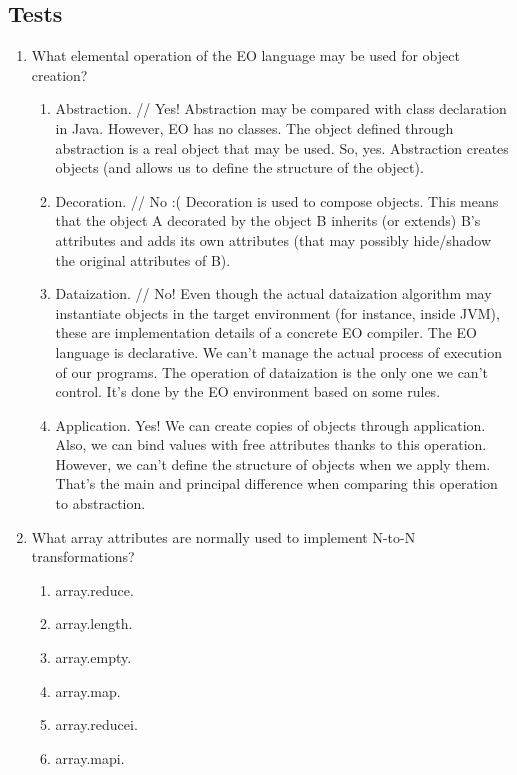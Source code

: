 \documentclass[12pt]{book}
\begin{document}
\subsection{Tests}
\begin{enumerate}
    \item What elemental operation of the EO language may be used for object creation?
    \begin{enumerate}
        \item Abstraction. // Yes! Abstraction may be compared with class declaration in Java. However, EO has no classes. The object defined through abstraction is a real object that may be used. So, yes. Abstraction creates objects (and allows us to define the structure of the object). 
        \item Decoration. // No :( Decoration is used to compose objects. This means that the object A decorated by the object B inherits (or extends) B’s attributes and adds its own attributes (that may possibly hide/shadow the original attributes of B). 
        \item Dataization. // No! Even though the actual dataization algorithm may instantiate objects in the target environment (for instance, inside JVM), these are implementation details of a concrete EO compiler. The EO language is declarative. We can’t manage the actual process of execution of our programs. The operation of dataization is the only one we can’t control. It’s done by the EO environment based on some rules. 
        \item Application. Yes! We can create copies of objects through application. Also, we can bind values with free attributes thanks to this operation. However, we can’t define the structure of objects when we apply them. That’s the main and principal difference when comparing this operation to abstraction. 
    \end{enumerate}
    
    \item What array attributes are normally used to implement N-to-N transformations?
    \begin{enumerate}
        \item array.reduce.
        \item array.length.
        \item array.empty.
        \item array.map.
        \item array.reducei.
        \item array.mapi.
    \end{enumerate}
    

\end{enumerate}
\end{document}
